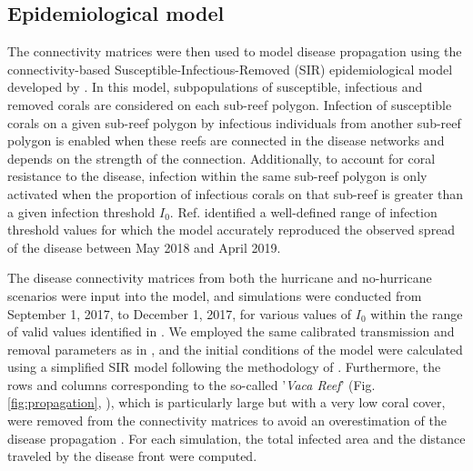 \documentclass[fleqn,10pt]{wlscirep}
\begin{document}
\subsection{Epidemiological model}
The connectivity matrices were then used to model disease propagation using the connectivity-based Susceptible-Infectious-Removed (SIR) epidemiological model developed by \citep{DobbySCTLD}. In this model, subpopulations of susceptible, infectious and removed corals are considered on each sub-reef polygon. Infection of susceptible corals on a given sub-reef polygon by infectious individuals from another sub-reef polygon is enabled when these reefs are connected in the disease networks and depends on the strength of the connection. Additionally, to account for coral resistance to the disease, infection within the same sub-reef polygon is only activated when the proportion of infectious corals on that sub-reef is greater than a given infection threshold $I_0$. Ref. \citep{DobbySCTLD} identified a well-defined range of infection threshold values for which the model accurately reproduced the observed spread of the disease between May 2018 and April 2019.

The disease connectivity matrices from both the hurricane and no-hurricane scenarios were input into the model, and simulations were conducted from September 1, 2017, to December 1, 2017, for various values of $I_0$ within the range of valid values identified in \citep{DobbySCTLD}. We employed the same calibrated transmission and removal parameters as in \citep{DobbySCTLD}, and the initial conditions of the model were calculated using a simplified SIR model following the methodology of \citep{DobbySCTLD}. Furthermore, the rows and columns corresponding to the so-called '\textit{Vaca Reef}' (Fig. \ref{fig:propagation}, \citealp{Frys2020}), which is particularly large but with a very low coral cover, were removed from the connectivity matrices to avoid an overestimation of the disease propagation \cite{DobbySCTLD}. For each simulation, the total infected area and the distance traveled by the disease front were computed.

\end{document}

